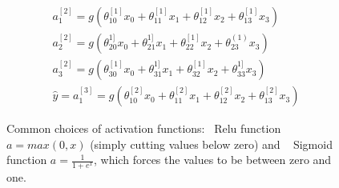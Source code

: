 \begin{equation}
\begin{split}
a_{ 1 }^{ [2] }=g(\theta _{ 10 }^{ [1] }x_{ 0 }+\theta _{ 11 }^{ [1]}x_{ 1 }+\theta _{ 12 }^{ [1] }x_{ 2 }+\theta _{ 13 }^{ [1] }x_{ 3 })\\ 
a_{ 2 }^{ [2] }=g(\theta _{ 20 }^{ 1] }x_{ 0 }+\theta _{ 21 }^{ 1] }x_{ 1 }+\theta _{ 22 }^{ [1] }x_{ 2 }+\theta _{ 23 }^{ (1) }x_{ 3 })\\
 a_{ 3 }^{ [2] }=g(\theta _{ 30 }^{ [1] }x_{ 0 }+\theta _{ 31 }^{ 1] }x_{ 1 }+\theta _{ 32 }^{ [1] }x_{ 2 }+\theta _{ 33 }^{ 1] }x_{ 3 })\\
  \hat { y } =a_{ 1 }^{ [3] }=g(\theta _{ 10 }^{ [2] }x_{ 0 }+\theta _{ 11 }^{ [2] }x_{ 1 }+\theta _{ 12 }^{ [2] }x_{ 2 }+\theta _{ 13 }^{ [2] }x_{ 3 })
\end{split}
\label{eq:nn_eq}
\end{equation}


\begin{figure}
\centering
{}
\caption{Common choices of activation functions:~ Relu function $a=max(0,x)$ (simply cutting values below zero) and ~ Sigmoid function $a=\frac{1}{1+e^{x}}$, which forces the values to be between zero and one.}
\label{fig:activation}
\end{figure}
